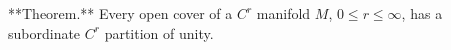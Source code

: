 **Theorem.** Every open cover of a $C^r$ manifold $M$, $0 \leq r \leq \infty$, has a subordinate $C^r$ partition of unity.
